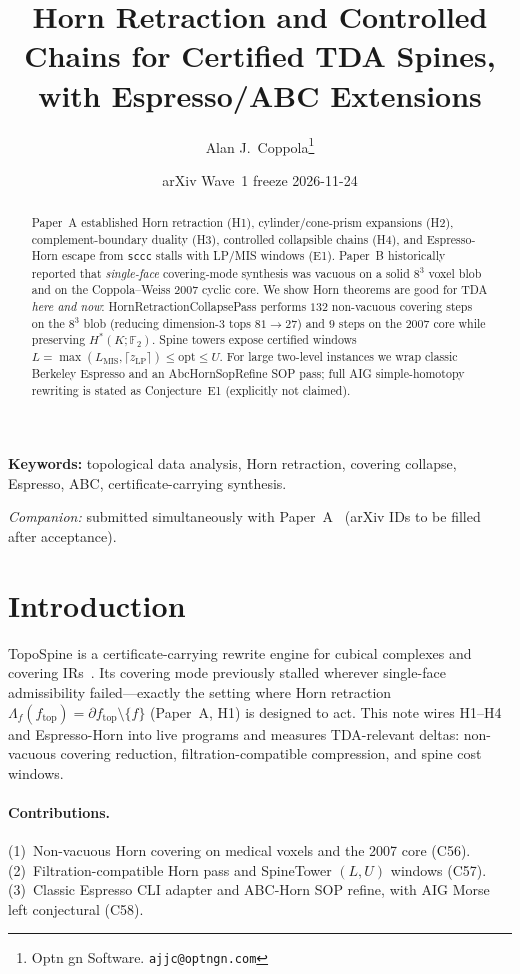 \documentclass[11pt]{article}
\title{Horn Retraction and Controlled Chains for Certified TDA Spines,\\
with Espresso/ABC Extensions}
\author{Alan J.\ Coppola\thanks{Optn gn Software. \texttt{ajjc@optngn.com}}}
\date{arXiv Wave~1 freeze 2026-11-24}
\begin{document}
\maketitle

\begin{abstract}
Paper~A established Horn retraction (H1), cylinder/cone-prism expansions (H2),
complement-boundary duality (H3), controlled collapsible chains (H4), and
Espresso-Horn escape from \texttt{sccc} stalls with LP/MIS windows (E1).
Paper~B historically reported that \emph{single-face} covering-mode synthesis was
vacuous on a solid $8^3$ voxel blob and on the Coppola--Weiss 2007 cyclic core.
We show Horn theorems are good for TDA \emph{here and now}:
\textsf{HornRetractionCollapsePass} performs $132$ non-vacuous covering steps on
the $8^3$ blob (reducing dimension-$3$ tops $81\to 27$) and $9$ steps on the 2007
core while preserving $H^*(K;\mathbb{F}_2)$.  Spine towers expose certified windows
$L=\max(L_{\mathrm{MIS}},\lceil z_{\mathrm{LP}}\rceil)\le\mathrm{opt}\le U$.
For large two-level instances we wrap classic Berkeley Espresso and an
\textsf{AbcHornSopRefine} SOP pass; full AIG simple-homotopy rewriting is stated
as Conjecture~E1 (explicitly not claimed).
\end{abstract}

\noindent\textbf{Keywords:} topological data analysis, Horn retraction, covering
collapse, Espresso, ABC, certificate-carrying synthesis.

\noindent\textit{Companion:} submitted simultaneously with Paper~A~\cite{paperA}
(arXiv IDs to be filled after acceptance).

\section{Introduction}
\label{sec:intro}

TopoSpine is a certificate-carrying rewrite engine for cubical complexes and
covering IRs~\cite{paperB}.  Its covering mode previously stalled wherever
single-face admissibility failed---exactly the setting where Horn retraction
$\Lambda_f(f_{\mathrm{top}})=\partial f_{\mathrm{top}}\setminus\{f\}$
(Paper~A, H1) is designed to act.  This note wires H1--H4 and Espresso-Horn
into live programs and measures TDA-relevant deltas: non-vacuous covering
reduction, filtration-compatible compression, and spine cost windows.

\paragraph{Contributions.}
(1)~Non-vacuous Horn covering on medical voxels and the 2007 core (C56).
(2)~Filtration-compatible Horn pass and SpineTower $(L,U)$ windows (C57).
(3)~Classic Espresso CLI adapter and ABC-Horn SOP refine, with AIG Morse left
conjectural (C58).
\end{document}
